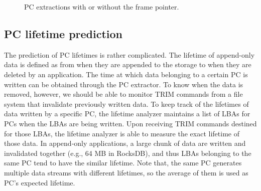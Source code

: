 \begin{figure}[t]
	\centering
	\vspace{-10pt}
	\caption{PC extractions with or without the frame pointer.}
	\label{fig:getpc}
	\vspace{-15pt}
\end{figure}


\vspace{-5pt}
\subsection{PC lifetime prediction}
The prediction of PC lifetimes is rather complicated. The lifetime of
append-only data is defined as from when they are appended to the storage to
when they are deleted by an application. The time at which data belonging to a
certain PC is written can be obtained through the PC extractor. To know when
the data is removed, however, we should be able to monitor TRIM commands from a
file system that invalidate previously written data.  To keep track of the
lifetimes of data written by a specific PC, the lifetime analyzer maintains a
list of LBAs for PCs when the LBAs are being written.  Upon receiving TRIM
commands destined for those LBAs, the lifetime analyzer is able to measure the
exact lifetime of those data. In append-only applications, a large chunk of
data are written and invalidated together (e.g., 64 MB in RocksDB), and thus
LBAs belonging to the same PC tend to have the similar lifetime. Note that, the
same PC generates multiple data streams with different lifetimes, so the
average of them is used as PC's expected lifetime.


